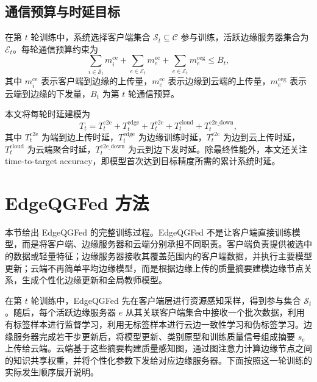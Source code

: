\documentclass[journal]{IEEEtran}
\begin{document}
\subsection{通信预算与时延目标}

在第 $t$ 轮训练中，系统选择客户端集合 $\mathcal{S}_t\subseteq\mathcal{C}$ 参与训练，活跃边缘服务器集合为 $\mathcal{E}_t$。每轮通信预算约束为
\begin{equation}
    \sum_{i\in\mathcal{S}_t} m_i^{\mathrm{ce}}
    + \sum_{e\in\mathcal{E}_t} m_e^{\mathrm{ec}}
    + \sum_{e\in\mathcal{E}_t} m_e^{\mathrm{ceg}}
    \le B_t ,
    \label{eq:budget}
\end{equation}
其中 $m_i^{\mathrm{ce}}$ 表示客户端到边缘的上传量，$m_e^{\mathrm{ec}}$ 表示边缘到云端的上传量，$m_e^{\mathrm{ceg}}$ 表示云端到边缘的下发量，$B_t$ 为第 $t$ 轮通信预算。

本文将每轮时延建模为
\begin{equation}
    T_t = T_t^{\mathrm{c2e}}
        + T_t^{\mathrm{edge}}
        + T_t^{\mathrm{e2c}}
        + T_t^{\mathrm{cloud}}
        + T_t^{\mathrm{c2e\_down}},
    \label{eq:latency}
\end{equation}
其中 $T_t^{\mathrm{c2e}}$ 为端到边上传时延，$T_t^{\mathrm{edge}}$ 为边缘训练时延，$T_t^{\mathrm{e2c}}$ 为边到云上传时延，$T_t^{\mathrm{cloud}}$ 为云端聚合时延，$T_t^{\mathrm{c2e\_down}}$ 为云到边下发时延。除最终性能外，本文还关注 time-to-target accuracy，即模型首次达到目标精度所需的累计系统时延。

\section{EdgeQGFed 方法}
\label{sec:method}

本节给出 EdgeQGFed 的完整训练过程。EdgeQGFed 不是让客户端直接训练模型，而是将客户端、边缘服务器和云端分别承担不同职责。客户端负责提供被选中的数据或轻量特征；边缘服务器接收其覆盖范围内的客户端数据，并执行主要模型更新；云端不再简单平均边缘模型，而是根据边缘上传的质量摘要建模边缘节点关系，生成个性化边缘更新和全局教师模型。

在第 $t$ 轮训练中，EdgeQGFed 先在客户端层进行资源感知采样，得到参与集合 $\mathcal{S}_t$。随后，每个活跃边缘服务器 $e$ 从其关联客户端集合中接收一个批次数据，利用有标签样本进行监督学习，利用无标签样本进行云边一致性学习和伪标签学习。边缘服务器完成若干步更新后，将模型更新、类别原型和训练质量信号组成摘要 $s_e$ 上传给云端。云端基于这些摘要构建质量感知图，通过图注意力计算边缘节点之间的知识共享权重，并将个性化参数下发给对应边缘服务器。下面按照这一轮训练的实际发生顺序展开说明。
\end{document}
